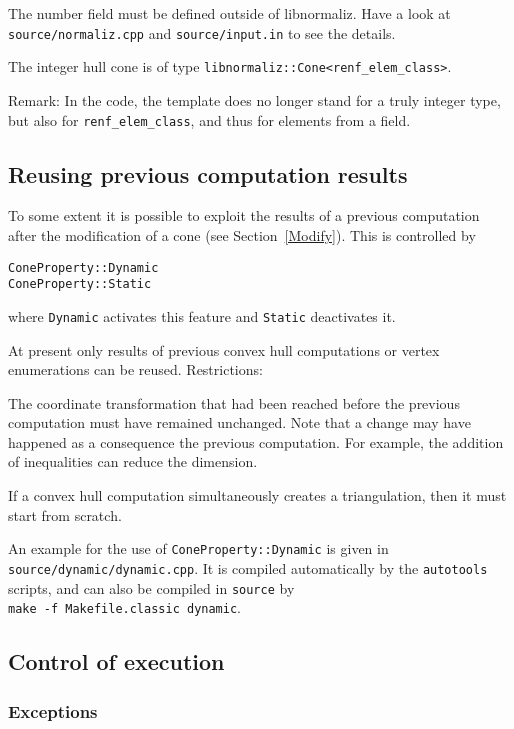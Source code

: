 \begin{small}
The number field must be defined outside of libnormaliz. Have a look at \verb|source/normaliz.cpp| and \verb|source/input.in| to see the details.

The integer hull cone is of type \verb|libnormaliz::Cone<renf_elem_class>|.

Remark: In the code, the template  does no longer stand for a truly integer type, but also for \verb|renf_elem_class|, and thus for elements from a field.

\subsection{Reusing previous computation results}

To some extent it is possible to exploit the results of a previous computation after the modification of a cone (see Section~\ref{Modify}). This is controlled by
\begin{Verbatim}
ConeProperty::Dynamic
ConeProperty::Static
\end{Verbatim}
where \verb|Dynamic| activates this feature and \verb|Static| deactivates it.

At present only results of previous convex hull computations or vertex enumerations can be reused. Restrictions:
\begin{arab}
	\item The coordinate transformation that had been reached before the previous computation must have remained unchanged. Note that a change may have happened as a consequence the previous computation. For example, the addition of inequalities can reduce the dimension.
	\item If a convex hull computation simultaneously creates a triangulation, then it must start from scratch.
\end{arab}

An example for the use of \verb|ConeProperty::Dynamic| is given in \verb|source/dynamic/dynamic.cpp|. It is compiled automatically by the \verb|autotools| scripts, and can also be compiled in \verb|source| by\\ \verb|make -f Makefile.classic dynamic|.

\subsection{Control of execution}

\subsubsection{Exceptions}


\end{small}
